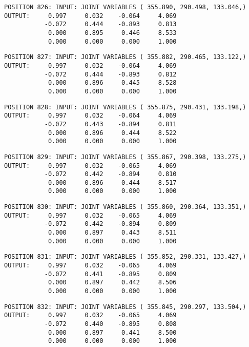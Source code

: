 \begin{verbatim}
POSITION 826: INPUT: JOINT VARIABLES ( 355.890, 290.498, 133.046,)
OUTPUT:     0.997     0.032    -0.064     4.069
           -0.072     0.444    -0.893     0.813
            0.000     0.895     0.446     8.533
            0.000     0.000     0.000     1.000
\end{verbatim} \pagebreak[1]\begin{verbatim}
POSITION 827: INPUT: JOINT VARIABLES ( 355.882, 290.465, 133.122,)
OUTPUT:     0.997     0.032    -0.064     4.069
           -0.072     0.444    -0.893     0.812
            0.000     0.896     0.445     8.528
            0.000     0.000     0.000     1.000
\end{verbatim} \pagebreak[1]\begin{verbatim}
POSITION 828: INPUT: JOINT VARIABLES ( 355.875, 290.431, 133.198,)
OUTPUT:     0.997     0.032    -0.064     4.069
           -0.072     0.443    -0.894     0.811
            0.000     0.896     0.444     8.522
            0.000     0.000     0.000     1.000
\end{verbatim} \pagebreak[1]\begin{verbatim}
POSITION 829: INPUT: JOINT VARIABLES ( 355.867, 290.398, 133.275,)
OUTPUT:     0.997     0.032    -0.065     4.069
           -0.072     0.442    -0.894     0.810
            0.000     0.896     0.444     8.517
            0.000     0.000     0.000     1.000
\end{verbatim} \pagebreak[1]\begin{verbatim}
POSITION 830: INPUT: JOINT VARIABLES ( 355.860, 290.364, 133.351,)
OUTPUT:     0.997     0.032    -0.065     4.069
           -0.072     0.442    -0.894     0.809
            0.000     0.897     0.443     8.511
            0.000     0.000     0.000     1.000
\end{verbatim} \pagebreak[1]\begin{verbatim}
POSITION 831: INPUT: JOINT VARIABLES ( 355.852, 290.331, 133.427,)
OUTPUT:     0.997     0.032    -0.065     4.069
           -0.072     0.441    -0.895     0.809
            0.000     0.897     0.442     8.506
            0.000     0.000     0.000     1.000
\end{verbatim} \pagebreak[1]\begin{verbatim}
POSITION 832: INPUT: JOINT VARIABLES ( 355.845, 290.297, 133.504,)
OUTPUT:     0.997     0.032    -0.065     4.069
           -0.072     0.440    -0.895     0.808
            0.000     0.897     0.441     8.500
            0.000     0.000     0.000     1.000
\end{verbatim} \pagebreak[1]\begin{verbatim}

\end{verbatim}
